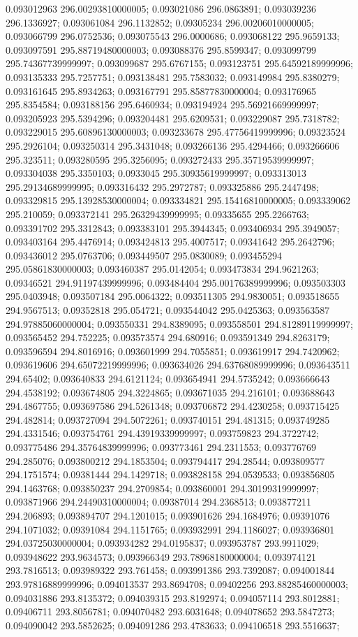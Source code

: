 0.093012963 296.00293810000005; 0.093021086 296.0863891; 0.093039236 296.1336927; 0.093061084 296.1132852; 0.09305234 296.00206010000005; 0.093066799 296.0752536; 0.093075543 296.0000686; 0.093068122 295.9659133; 0.093097591 295.88719480000003; 0.093088376 295.8599347; 0.093099799 295.74367739999997; 0.093099687 295.6767155; 0.093123751 295.64592189999996; 0.093135333 295.7257751; 0.093138481 295.7583032; 0.093149984 295.8380279; 0.093161645 295.8934263; 0.093167791 295.85877830000004; 0.093176965 295.8354584; 0.093188156 295.6460934; 0.093194924 295.56921669999997; 0.093205923 295.5394296; 0.093204481 295.6209531; 0.093229087 295.7318782; 0.093229015 295.60896130000003; 0.093233678 295.47756419999996; 0.09323524 295.2926104; 0.093250314 295.3431048; 0.093266136 295.4294466; 0.093266606 295.323511; 0.093280595 295.3256095; 0.093272433 295.35719539999997; 0.093304038 295.3350103; 0.0933045 295.30935619999997; 0.093313013 295.29134689999995; 0.093316432 295.2972787; 0.093325886 295.2447498; 0.093329815 295.13928530000004; 0.093334821 295.15416810000005; 0.093339062 295.210059; 0.093372141 295.26329439999995; 0.09335655 295.2266763; 0.093391702 295.3312843; 0.093383101 295.3944345; 0.093406934 295.3949057; 0.093403164 295.4476914; 0.093424813 295.4007517; 0.09341642 295.2642796; 0.093436012 295.0763706; 0.093449507 295.0830089; 0.093455294 295.05861830000003; 0.093460387 295.0142054; 0.093473834 294.9621263; 0.09346521 294.91197439999996; 0.093484404 295.00176389999996; 0.093503303 295.0403948; 0.093507184 295.0064322; 0.093511305 294.9830051; 0.093518655 294.9567513; 0.09352818 295.054721; 0.093544042 295.0425363; 0.093563587 294.97885060000004; 0.093550331 294.8389095; 0.093558501 294.81289119999997; 0.093565452 294.752225; 0.093573574 294.680916; 0.093591349 294.8263179; 0.093596594 294.8016916; 0.093601999 294.7055851; 0.093619917 294.7420962; 0.093619606 294.65072219999996; 0.093634026 294.63768089999996; 0.093643511 294.65402; 0.093640833 294.6121124; 0.093654941 294.5735242; 0.093666643 294.4538192; 0.093674805 294.3224865; 0.093671035 294.216101; 0.093688643 294.4867755; 0.093697586 294.5261348; 0.093706872 294.4230258; 0.093715425 294.482814; 0.093727094 294.5072261; 0.093740151 294.481315; 0.093749285 294.4331546; 0.093754761 294.43919339999997; 0.093759823 294.3722742; 0.093775486 294.35764839999996; 0.093773461 294.2311553; 0.093776769 294.285076; 0.093800212 294.1853504; 0.093794417 294.28544; 0.093809577 294.1751574; 0.09381444 294.1429718; 0.093828158 294.0539533; 0.093856805 294.1463768; 0.093850237 294.2709854; 0.093860001 294.30199319999997; 0.093871966 294.24490310000004; 0.09387014 294.2368513; 0.093877211 294.206893; 0.093894707 294.1201015; 0.093901626 294.1684976; 0.09391076 294.1071032; 0.09391084 294.1151765; 0.093932991 294.1186027; 0.093936801 294.03725030000004; 0.093934282 294.0195837; 0.093953787 293.9911029; 0.093948622 293.9634573; 0.093966349 293.78968180000004; 0.093974121 293.7816513; 0.093989322 293.761458; 0.093991386 293.7392087; 0.094001844 293.97816889999996; 0.094013537 293.8694708; 0.09402256 293.88285460000003; 0.094031886 293.8135372; 0.094039315 293.8192974; 0.094057114 293.8012881; 0.09406711 293.8056781; 0.094070482 293.6031648; 0.094078652 293.5847273; 0.094090042 293.5852625; 0.094091286 293.4783633; 0.094106518 293.5516637; 